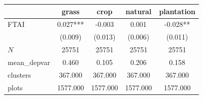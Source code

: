 {
\def\sym#1{\ifmmode^{#1}\else\(^{#1}\)\fi}
\begin{tabular}{l*{4}{c}}
\toprule
          &\multicolumn{1}{c}{grass}&\multicolumn{1}{c}{crop}&\multicolumn{1}{c}{natural}&\multicolumn{1}{c}{plantation}\\
\midrule
FTAI      &    0.027***&   -0.003   &    0.001   &   -0.028** \\
          &  (0.009)   &  (0.013)   &  (0.006)   &  (0.011)   \\
\midrule
\(N\)     &    25751   &    25751   &    25751   &    25751   \\
mean\_depvar&    0.460   &    0.105   &    0.206   &    0.158   \\
clusters  &  367.000   &  367.000   &  367.000   &  367.000   \\
plots     & 1577.000   & 1577.000   & 1577.000   & 1577.000   \\
\bottomrule
\end{tabular}
}
